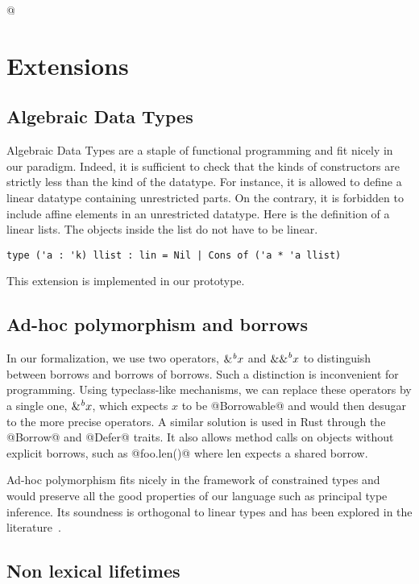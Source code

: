 \lstMakeShortInline[keepspaces,basicstyle=\small\ttfamily]@
\section{Extensions}

\subsection{Algebraic Data Types}

Algebraic Data Types are a staple of functional programming and fit nicely
in our paradigm. Indeed, it is sufficient to check that the kinds of constructors
are strictly less than the kind of the datatype.
For instance, it is allowed to define a linear datatype containing unrestricted
parts.
On the contrary, it is forbidden to include affine elements in an unrestricted
datatype.
Here is the definition of a linear lists. The objects inside the list do not have to be linear.

\begin{lstlisting}
type ('a : 'k) llist : lin = Nil | Cons of ('a * 'a llist)
\end{lstlisting}

This extension is implemented in our prototype.

\subsection{Ad-hoc polymorphism and borrows}

In our formalization, we use two operators, ${\&}^{\textit{b}}x$ and ${\&\&}^{\textit{b}}x$ to
distinguish between borrows and borrows of borrows.
Such a distinction is inconvenient for programming.
Using typeclass-like mechanisms, we can replace these operators
by a single one, ${\&}^{\textit{b}}x$, which expects $x$ to be @Borrowable@ and
would then desugar to the more precise operators.
A similar solution is used in Rust through the @Borrow@ and @Defer@
traits.
It also allows method calls on objects without
explicit borrows, such as @foo.len()@ where len expects a shared borrow.

Ad-hoc polymorphism fits nicely in the framework of constrained
types and would preserve all the good properties of our language such
as principal type inference. Its soundness is orthogonal to linear types
and has been explored in the literature~\citep{DBLP:journals/scp/Jones94}.

\subsection{Non lexical lifetimes}

